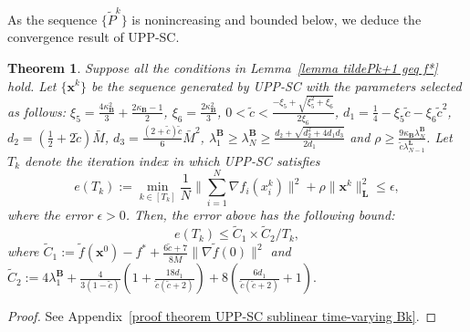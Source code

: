 \documentclass[12pt,draftcls,onecolumn]{IEEEtran}
\newtheorem{theorem}{Theorem}
\begin{document}
As the sequence $\{\tilde{P}^{k}\}$ is nonincreasing and bounded below, we deduce the convergence result of UPP-SC.
\begin{theorem}\label{theorem UPP-SC sublinear time-varying Bk}
	Suppose all the conditions in Lemma~\ref{lemma tildePk+1 geq f*} hold. Let $\{\mathbf{x}^k\}$ be the sequence generated by UPP-SC with the parameters selected as follows: $\xi_5=\frac{4\kappa_{\mathbf{B}}^2}{3}+\frac{2\kappa_{\mathbf{B}}-1}{2}$, $\xi_6= \frac{2\kappa_{\mathbf{B}}^2}{3}$, $0<\tilde{c}<\frac{-\xi_5+\sqrt{\xi_5^2+\xi_6}}{2\xi_6}$, $d_1= \frac{1}{4}- \xi_5 \tilde{c}-\xi_6 \tilde{c}^2$, $d_2 = (\frac{1}{2}+2\tilde{c})\bar{M}$, $d_3=\frac{(2+\tilde{c})\tilde{c}}{6}\bar{M}^2$, $\lambda_1^{\mathbf{B}}\geq\lambda_N^{\mathbf{B}}\geq \frac{d_2+\sqrt{d_2^2+4d_1d_3}}{2d_1}$ and $\rho \geq \frac{9\kappa_{\mathbf{B}}\lambda_N^{\mathbf{B}}}{\tilde{c}\lambda_{N-1}^{\mathbf{L}}}$.
	Let $T_k$ denote the iteration index in which UPP-SC satisfies
	\begin{equation}
		e(T_k):= \min_{k\in[T_k]}\frac{1}{N}\|\sum_{i=1}^N \nabla {f}_i(x_i^k)\|^2+\rho\|\mathbf{x}^{k}\|^2_\mathbf{L}\leq \epsilon, \label{eT time-varying Bk}
	\end{equation}
	where the error $\epsilon>0$. Then, the error above has the following bound:
	\begin{equation}
		e(T_k) \leq \tilde{C}_1\times {\tilde{C}_2}/{T_k}, \label{epsilon leq tildeC1C2/T}
	\end{equation}
	where $\tilde{C}_1:= \tilde{f}(\mathbf{x}^0)-f^*+\frac{6\tilde{c}+7}{8\bar{M}}\|\nabla \tilde{f}(0)\|^2$ and $\tilde{C}_2:= 4{\lambda}_1^{\mathbf{B}}+\frac{4}{3(1-\tilde{c})}(1+\frac{18d_1}{\tilde{c}(\tilde{c}+2)})+8(\frac{6d_1}{\tilde{c}(\tilde{c}+2)}+1).$
\end{theorem}
\begin{proof}
    See Appendix~\ref{proof theorem UPP-SC sublinear time-varying Bk}.
\end{proof}
\end{document}
